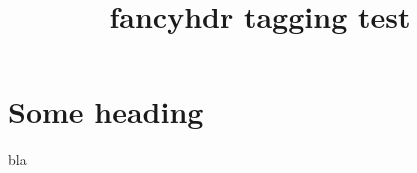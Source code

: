 \documentclass{article}
\title{fancyhdr tagging test}
\begin{document}
\section{Some heading}

bla
\end{document}
